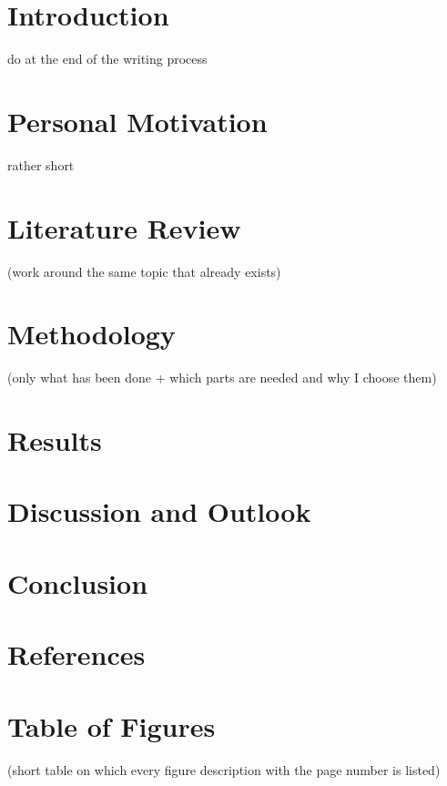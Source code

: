 \documentclass{article}
\begin{document}
	
	\section{Introduction}
	do at the end of the writing process
	\section{Personal Motivation}
	rather short
	\section{Literature Review}
	(work around the same topic that already exists)
	\section{Methodology}
	(only what has been done + which parts are needed and why I choose them)
	\section{Results}
	\section{Discussion and Outlook}
	\section{Conclusion}
	
	\section{References}
	\printbibliography[
	heading=bibintoc,
	title={Bibliography}
	]	
	\section{Table of Figures}
	(short table on which every figure description with the page number is listed)
\end{document}
